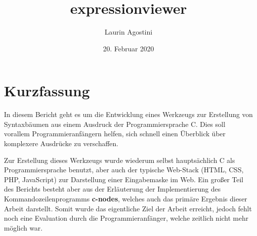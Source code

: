 \documentclass[oneside]{ausarbeitung}
\begin{document}



\title{expressionviewer}

\author{Laurin Agostini}

\date{20. Februar 2020}

\maketitle
\cleardoublepage

\setcounter{page}{1}


\makeaffirmation
\cleardoublepage

\chapter*{Kurzfassung}

In diesem Bericht geht es um die Entwicklung eines Werkzeugs zur Erstellung von Syntaxbäumen aus einem Ausdruck der Programmiersprache C. Dies soll vorallem Programmieranfängern helfen, sich schnell einen Überblick über komplexere Ausdrücke zu verschaffen.

Zur Erstellung dieses Werkzeugs wurde wiederum selbst hauptsächlich C als Programmiersprache benutzt, aber auch der typische Web-Stack (HTML, CSS, PHP, JavaScript) zur Darstellung einer Eingabemaske im Web. Ein großer Teil des Berichts besteht aber aus der Erläuterung der Implementierung des Kommandozeilenprogramms \textbf{c-nodes}, welches auch das primäre Ergebnis dieser Arbeit darstellt. Somit wurde das eigentliche Ziel der Arbeit erreicht, jedoch fehlt noch eine Evaluation durch die Programmieranfänger, welche zeitlich nicht mehr möglich war.

\cleardoublepage
{}
\tableofcontents

\listoffigures

\listoftables
\end{document}
